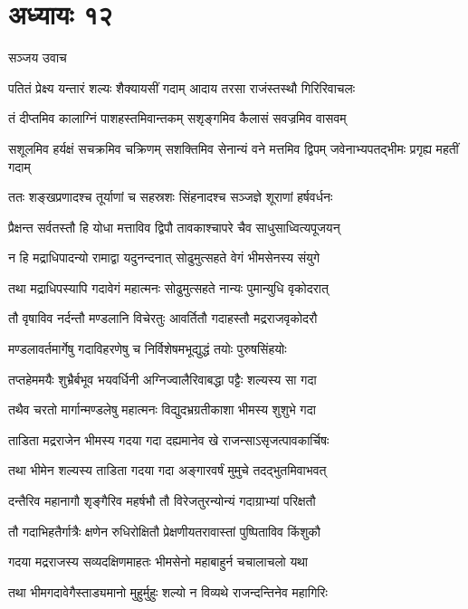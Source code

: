 \chapter{अध्यायः १२}
\twolineshloka
{सञ्जय उवाच}
{}


\twolineshloka
{पतितं प्रेक्ष्य यन्तारं शल्यः शैक्यायसीं गदाम्}
{आदाय तरसा राजंस्तस्थौ गिरिरिवाचलः}


\twolineshloka
{तं दीप्तमिव कालाग्निं पाशहस्तमिवान्तकम्}
{सशृङ्गमिव कैलासं सवज्रमिव वासवम्}


\threelineshloka
{सशूलमिव हर्यक्षं सचक्रमिव चक्रिणम्}
{सशक्तिमिव सेनान्यं वने मत्तमिव द्विपम्}
{जवेनाभ्यपतद्भीमः प्रगृह्य महतीं गदाम्}


\twolineshloka
{ततः शङ्खप्रणादश्च तूर्याणां च सहस्रशः}
{सिंहनादश्च सञ्जज्ञे शूराणां हर्षवर्धनः}


\twolineshloka
{प्रैक्षन्त सर्वतस्तौ हि योधा मत्ताविव द्विपौ}
{तावकाश्चापरे चैव साधुसाध्वित्यपूजयन्}


\twolineshloka
{न हि मद्राधिपादन्यो रामाद्वा यदुनन्दनात्}
{सोढुमुत्सहते वेगं भीमसेनस्य संयुगे}


\twolineshloka
{तथा मद्राधिपस्यापि गदावेगं महात्मनः}
{सोढुमुत्सहते नान्यः पुमान्युधि वृकोदरात्}


\twolineshloka
{तौ वृषाविव नर्दन्तौ मण्डलानि विचेरतुः}
{आवर्तितौ गदाहस्तौ मद्रराजवृकोदरौ}


\twolineshloka
{मण्डलावर्तमार्गेषु गदाविहरणेषु च}
{निर्विशेषमभूद्युद्धं तयोः पुरुषसिंहयोः}


\twolineshloka
{तप्तहेममयैः शुभ्रैर्बभूव भयवर्धिनी}
{अग्निज्वालैरिवाबद्धा पट्टैः शल्यस्य सा गदा}


\twolineshloka
{तथैव चरतो मार्गान्मण्डलेषु महात्मनः}
{विद्युदभ्रग्रतीकाशा भीमस्य शुशुभे गदा}


\twolineshloka
{ताडिता मद्रराजेन भीमस्य गदया गदा}
{दह्यमानेव खे राजन्साऽसृजत्पावकार्चिषः}


\twolineshloka
{तथा भीमेन शल्यस्य ताडिता गदया गदा}
{अङ्गारवर्षं मुमुचे तदद्भुतमिवाभवत्}


\twolineshloka
{दन्तैरिव महानागौ शृङ्गैरिव महर्षभौ}
{तौ विरेजतुरन्योन्यं गदाग्राभ्यां परिक्षतौ}


\twolineshloka
{तौ गदाभिहतैर्गात्रैः क्षणेन रुधिरोक्षितौ}
{प्रेक्षणीयतरावास्तां पुष्पिताविव किंशुकौ}


\twolineshloka
{गदया मद्रराजस्य सव्यदक्षिणमाहतः}
{भीमसेनो महाबाहुर्न चचालाचलो यथा}


\twolineshloka
{तथा भीमगदावेगैस्ताड्यमानो मुहुर्मुहुः}
{शल्यो न विव्यथे राजन्दन्तिनेव महागिरिः}



